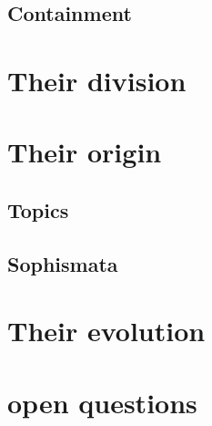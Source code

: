 \documentclass[]{article}
\begin{document}
\subsection{Containment}
\section{Their division}
\section{Their origin}
\subsection{Topics}
\subsection{Sophismata}
\section{Their evolution}
\section{open questions}

\printbibliography
\end{document}

